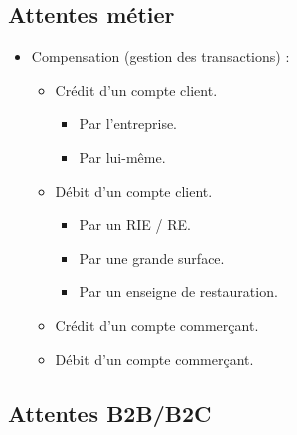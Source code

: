 \subsection{Attentes métier}

\begin{itemize}
    \item Compensation (gestion des transactions) :
        \begin{itemize}
            \item Crédit d'un compte client.
                \begin{itemize}
                    \item Par l'entreprise.
                    \item Par lui-même.
                \end{itemize}
            \item Débit d'un compte client.
                \begin{itemize}
                    \item Par un RIE / RE.
                    \item Par une grande surface.
                    \item Par un enseigne de restauration.
                \end{itemize}
            \item Crédit d'un compte commerçant.
            \item Débit d'un compte commerçant.
        \end{itemize}
\end{itemize}

\subsection{Attentes B2B/B2C}

